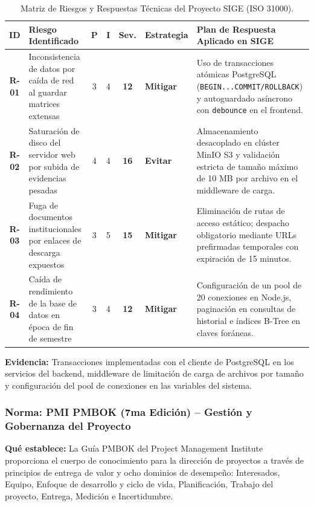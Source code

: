 \documentclass[12pt,a4paper]{article}
\begin{document}
\begin{table}[H]
\centering
\small
\renewcommand{\arraystretch}{1.2}
\begin{tabularx}{\textwidth}{|c|p{4.0cm}|c|c|c|p{2.2cm}|X|}
\hline
\rowcolor{tableheader}
\textbf{ID} & \textbf{Riesgo Identificado} & \textbf{P} & \textbf{I} & \textbf{Sev.} & \textbf{Estrategia} & \textbf{Plan de Respuesta Aplicado en SIGE} \\ \hline
\textbf{R-01} & Inconsistencia de datos por caída de red al guardar matrices extensas & 3 & 4 & \textbf{12} & \textbf{Mitigar} & Uso de transacciones atómicas PostgreSQL (\texttt{BEGIN...COMMIT/ROLLBACK}) y autoguardado asíncrono con \texttt{debounce} en el frontend. \\ \hline
\textbf{R-02} & Saturación de disco del servidor web por subida de evidencias pesadas & 4 & 4 & \textbf{16} & \textbf{Evitar} & Almacenamiento desacoplado en clúster MinIO S3 y validación estricta de tamaño máximo de 10 MB por archivo en el middleware de carga. \\ \hline
\textbf{R-03} & Fuga de documentos institucionales por enlaces de descarga expuestos & 3 & 5 & \textbf{15} & \textbf{Mitigar} & Eliminación de rutas de acceso estático; despacho obligatorio mediante URLs prefirmadas temporales con expiración de 15 minutos. \\ \hline
\textbf{R-04} & Caída de rendimiento de la base de datos en época de fin de semestre & 3 & 4 & \textbf{12} & \textbf{Mitigar} & Configuración de un pool de 20 conexiones en Node.js, paginación en consultas de historial e índices B-Tree en claves foráneas. \\ \hline
\end{tabularx}
\caption{Matriz de Riesgos y Respuestas Técnicas del Proyecto SIGE (ISO 31000).}
\end{table}

\textbf{Evidencia:}
Transacciones implementadas con el cliente de PostgreSQL en los servicios del backend, middleware de limitación de carga de archivos por tamaño y configuración del pool de conexiones en las variables del sistema.

\subsubsection{Norma: PMI PMBOK (7ma Edición) -- Gestión y Gobernanza del Proyecto}

\textbf{Qué establece:}
La Guía PMBOK del Project Management Institute proporciona el cuerpo de conocimiento para la dirección de proyectos a través de principios de entrega de valor y ocho dominios de desempeño: Interesados, Equipo, Enfoque de desarrollo y ciclo de vida, Planificación, Trabajo del proyecto, Entrega, Medición e Incertidumbre.
\end{document}
